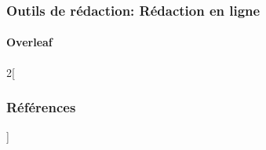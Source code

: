 \documentclass[xcolor=table]{beamer}
\begin{document}
\begin{frame}
\frametitle{Outils de rédaction: Rédaction en ligne}
\framesubtitle{Overleaf}


\end{frame}

\nocite{*}
%
% 

\begin{multicols*}{2}[\frametitle{Références}]%
	\tiny
	
	
\end{multicols*}
\end{document}
